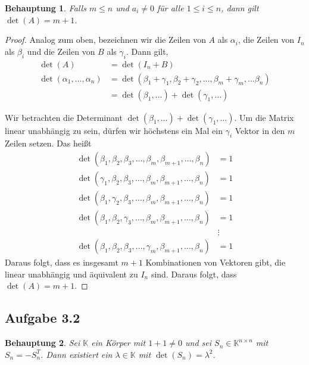 \documentclass[draft,a5paper]{article}
\newtheorem*{beh}{Behauptung}
\begin{document}
\begin{beh}
Falls \(m \le n\) und \(a_{i} \ne 0\) für alle \(1 \le i \le n\), dann gilt
\(\det(A) = m + 1\).
\end{beh}

\begin{proof}
  Analog zum oben, bezeichnen wir die Zeilen von \(A\) als
  \(\alpha_{i}\), die Zeilen von \(I_{n}\) als \(\beta_{i}\) und die Zeilen von
  \(B\) als \(\gamma_{i}\).  Dann gilt,
\begin{align*}
  \det(A)
  &= \det(I_{n} + B) \\
  \det(\alpha_{1}, \ldots, \alpha_{n})
  &= \det(\beta_{1} + \gamma_{1}, \beta_{2} + \gamma_{2}, \ldots, \beta_{m}
    + \gamma_{m}, \ldots \beta_{n}) \\
  &= \det(\beta_{1}, \ldots) + \det(\gamma_{1}, \ldots)
\end{align*}

Wir betrachten die Determinant
\(\det(\beta_{1}, \ldots) + \det(\gamma_{1}, \ldots)\).  Um die Matrix linear unabhängig
zu sein, dürfen wir höchstens ein Mal ein \(\gamma_{i}\) Vektor in den
\(m\) Zeilen setzen.  Das heißt
\begin{align*}
  \det(\beta_{1}, \beta_{2}, \beta_{3}, \ldots, \beta_{m}, \beta_{m + 1}, \ldots, \beta_{n}) &= 1 \\
  \det(\gamma_{1}, \beta_{2}, \beta_{3}, \ldots, \beta_{m}, \beta_{m + 1}, \ldots, \beta_{n}) &= 1 \\
  \det(\beta_{1}, \gamma_{2}, \beta_{3}, \ldots, \beta_{m}, \beta_{m + 1}, \ldots, \beta_{n}) &= 1 \\
  \det(\beta_{1}, \beta_{2}, \gamma_{3}, \ldots, \beta_{m}, \beta_{m + 1}, \ldots, \beta_{n}) &= 1 \\
                               &\vdots \\
  \det(\beta_{1}, \beta_{2}, \beta_{3}, \ldots, \gamma_{m}, \beta_{m + 1}, \ldots, \beta_{n}) &= 1
\end{align*}
Daraus folgt, dass es insgesamt \(m+1\) Kombinationen von Vektoren
gibt, die linear unabhängig und äquivalent zu \(I_{n}\) sind.  Daraus
folgt, dass \(\det(A) = m + 1\).
\end{proof}

\subsection*{Aufgabe 3.2}

\begin{beh}
Sei \(\mathbb{K}\) ein Körper mit \(1 + 1 \ne 0\) und sei \(S_{n} \in \mathbb{K}^{n \times n}\)
mit \(S_{n} = - S_{n}^{T}\).  Dann existiert ein \(\lambda \in \mathbb{K}\) mit
\(\det(S_{n}) = \lambda^{2}\).
\end{beh}
\end{document}

